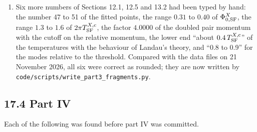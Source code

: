 \documentclass[
  10pt,
]{article}
\begin{document}
\begin{enumerate}
  program had computed the ratio: the bound holds for the three HS
  methods but not for KS and CJT, where the larger mass is \(0.213\) of
  \(M^{X,{\rm H}}_{\rm SF}/2\); and the sentence named only the factor
  of the phase space of the decays into \(W^+W^-\) and \(ZZ\), not that
  of the sum over the polarizations of the bosons. It was found on 21
  November 2026, when every number typed in the drafts of the article
  for Physical Review D was compared with the data files and the
  reports. Section 14.6 now gives the whole factor at tree level and its
  values, which \texttt{code/scripts/write\_part3\_fragments.py}
  computes from \texttt{data/part3\_higgs.csv}; the ranges of the masses
  of the effective Lagrangian against the linear response (Sections 13.2
  and 14.6), typed as ``7 to 17 per cent'', are now computed by the same
  program, separately for the amplitude mode and for the non-unitary
  modes.
\item
  Six more numbers of Sections 12.1, 12.5 and 13.2 had been typed by
  hand: the number 47 to 51 of the fitted points, the range \(0.31\) to
  \(0.40\) of \(\Phi^X_{0,{\rm SF}}\), the range \(1.3\) to \(1.6\) of
  \(2\pi T^{X,{\rm c}}_{\rm SF}\), the factor \(4.0000\) of the doubled
  pair momentum with the cutoff on the relative momentum, the lower end
  ``about \(0.4\,T^{X,{\rm c}}_{\rm SF}\)'' of the temperatures with the
  behaviour of Landau's theory, and ``0.8 to 0.9'' for the modes
  relative to the threshold. Compared with the data files on 21 November
  2026, all six were correct as rounded; they are now written by
  \texttt{code/scripts/write\_part3\_fragments.py}.
\end{enumerate}

\hypertarget{part-iv}{%
\subsection{17.4 Part IV}\label{part-iv}}

Each of the following was found before part IV was committed.
\end{document}
